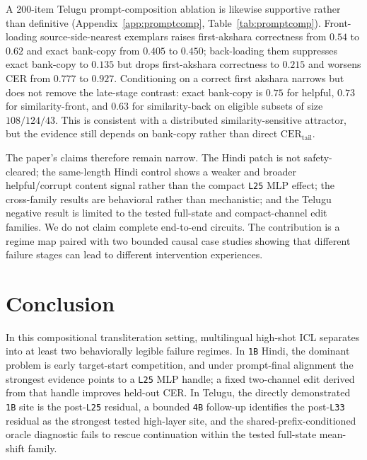 \documentclass{article}
\begin{document}
A 200-item Telugu prompt-composition ablation is likewise supportive rather than definitive (Appendix~\ref{app:promptcomp}, Table~\ref{tab:promptcomp}). Front-loading source-side-nearest exemplars raises first-akshara correctness from $0.54$ to $0.62$ and exact bank-copy from $0.405$ to $0.450$; back-loading them suppresses exact bank-copy to $0.135$ but drops first-akshara correctness to $0.215$ and worsens CER from $0.777$ to $0.927$. Conditioning on a correct first akshara narrows but does not remove the late-stage contrast: exact bank-copy is $0.75$ for helpful, $0.73$ for similarity-front, and $0.63$ for similarity-back on eligible subsets of size $108/124/43$. This is consistent with a distributed similarity-sensitive attractor, but the evidence still depends on bank-copy rather than direct $\mathrm{CER}_{\mathrm{tail}}$.

The paper's claims therefore remain narrow. The Hindi patch is not safety-cleared; the same-length Hindi control shows a weaker and broader helpful/corrupt content signal rather than the compact \texttt{L25} MLP effect; the cross-family results are behavioral rather than mechanistic; and the Telugu negative result is limited to the tested full-state and compact-channel edit families. We do not claim complete end-to-end circuits. The contribution is a regime map paired with two bounded causal case studies showing that different failure stages can lead to different intervention experiences.

\section{Conclusion}

In this compositional transliteration setting, multilingual high-shot ICL separates into at least two behaviorally legible failure regimes. In \texttt{1B} Hindi, the dominant problem is early target-start competition, and under prompt-final alignment the strongest evidence points to a \texttt{L25} MLP handle; a fixed two-channel edit derived from that handle improves held-out CER. In Telugu, the directly demonstrated \texttt{1B} site is the post-\texttt{L25} residual, a bounded \texttt{4B} follow-up identifies the post-\texttt{L33} residual as the strongest tested high-layer site, and the shared-prefix-conditioned oracle diagnostic fails to rescue continuation within the tested full-state mean-shift family.
\end{document}
